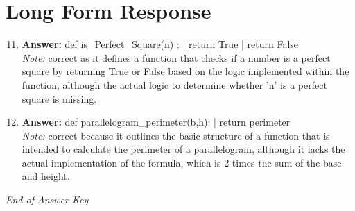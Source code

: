 \documentclass[12pt]{article}
\begin{document}
\section*{Long Form Response}
\begin{enumerate}[label=\arabic*.]
\setcounter{enumi}{10}
\item \textbf{Answer:} def is\_Perfect\_Square(n) : | return True | return False
\\ \textit{Note:} correct as it defines a function that checks if a number is a perfect square by returning True or False based on the logic implemented within the function, although the actual logic to determine whether 'n' is a perfect square is missing.
\item \textbf{Answer:} def parallelogram\_perimeter(b,h): | return perimeter
\\ \textit{Note:} correct because it outlines the basic structure of a function that is intended to calculate the perimeter of a parallelogram, although it lacks the actual implementation of the formula, which is 2 times the sum of the base and height.
\end{enumerate}

\vfill
\noindent\textit{End of Answer Key}
\end{document}
